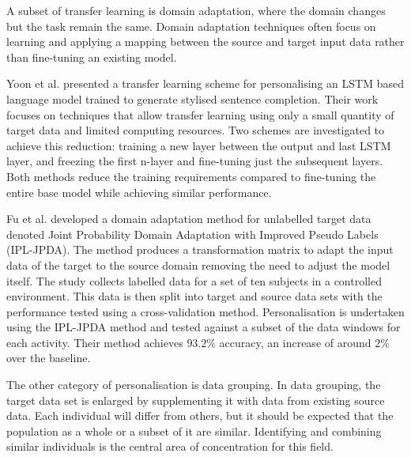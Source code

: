 A subset of transfer learning is domain adaptation, where the domain changes but the task remain the same\cite{Goodfellow2015}. Domain adaptation techniques often focus on learning and applying a mapping between the source and target input data rather than fine-tuning an existing model.

Yoon et al. presented a transfer learning scheme for personalising an LSTM based language model trained to generate stylised sentence completion. Their work focuses on techniques that allow transfer learning using only a small quantity of target data and limited computing resources. Two schemes are investigated to achieve this reduction: training a new layer between the output and last LSTM layer, and freezing the first n-layer and fine-tuning just the subsequent layers. Both methods reduce the training requirements compared to fine-tuning the entire base model while achieving similar performance.\cite{Yoon2017}

Fu et al. developed a domain adaptation method for unlabelled target data denoted Joint Probability Domain Adaptation with Improved Pseudo Labels (IPL-JPDA). The method produces a transformation matrix to adapt the input data of the target to the source domain removing the need to adjust the model itself. The study collects labelled data for a set of ten subjects in a controlled environment. This data is then split into target and source data sets with the performance tested using a cross-validation method. Personalisation is undertaken using the IPL-JPDA method and tested against a subset of the data windows for each activity. Their method achieves $93.2\%$ accuracy, an increase of around $2\%$ over the baseline.\cite{Fu2021}


The other category of personalisation is data grouping. In data grouping, the target data set is enlarged by supplementing it with data from existing source data. Each individual will differ from others, but it should be expected that the population as a whole or a subset of it are similar\cite{Schneider2021, Nguyen2021}. Identifying and combining similar individuals is the central area of concentration for this field.

